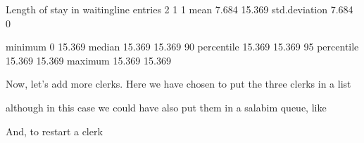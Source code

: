 \documentclass[letterpaper,10pt,english]{sphinxmanual}
\begin{document}
\begin{sphinxVerbatim}[commandchars=\\\{\}]
Length of stay in waitingline                entries               2            1            1
                                             mean                  7.684       15.369
                                             std.deviation         7.684        0

                                             minimum               0           15.369
                                             median               15.369       15.369
                                             90\PYGZpc{} percentile       15.369       15.369
                                             95\PYGZpc{} percentile       15.369       15.369
                                             maximum              15.369       15.369
\end{sphinxVerbatim}

Now, let’s add more clerks. Here we have chosen to put the three clerks in a list

\begin{sphinxVerbatim}[commandchars=\\\{\}]
  \PYG{p}{[}    \PYG{p}{]}
\end{sphinxVerbatim}

although in this case we could have also put them in a salabim queue, like

\begin{sphinxVerbatim}[commandchars=\\\{\}]
  
   
\end{sphinxVerbatim}

And, to restart a clerk

\begin{sphinxVerbatim}[commandchars=\\\{\}]
   
     
         
\end{sphinxVerbatim}
\end{document}
